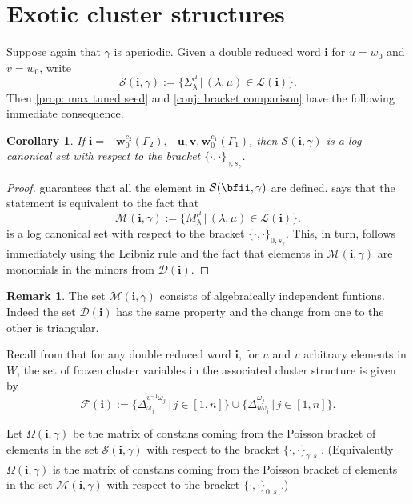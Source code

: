 \documentclass[a4paper]{amsart}
\newtheorem{corollary}[theorem]{Corollary}
\theoremstyle{definition}
\newtheorem{remark}[theorem]{Remark}
\newcommand{\mcF}{\mathcal{F}}
\newcommand{\mcL}{\mathcal{L}}
\newcommand{\mcD}{\mathcal{D}}
\newcommand{\mcM}{\mathcal{M}}
\newcommand{\mcS}{\mathcal{S}}
\newcommand{\bfi}{\mathbf{i}}
\newcommand{\bfu}{\mathbf{u}}
\newcommand{\bfv}{\mathbf{v}}
\newcommand{\bfw}{\mathbf{w}}
\begin{document}
\section{Exotic cluster structures}
Suppose again that $\gamma$ is aperiodic.
Given a double reduced word $\bfi$ for $u = w_0$ and $v = w_0$, write
\[
  \mcS(\bfi,\gamma)
  :=
  \Big\{
    \Sigma_\lambda^\mu \,\Big|\, (\lambda,\mu) \in \mcL(\bfi)
  \Big\}.
\]
Then \cref{prop: max tuned seed} and \cref{conj: bracket comparison} have the following immediate consequence.
\begin{corollary}
  If $\bfi = -\bfw^{c_2}_0(\Gamma_2), -\bfu, \bfv, \bfw^{c_1}_0(\Gamma_1)$, then $\mcS(\bfi,\gamma)$ is a log-canonical set with respect to the bracket $\{\cdot,\cdot\}_{\gamma,s_\gamma}$.
\end{corollary}
\begin{proof}
   guarantees that all the element in $\mcS(\bfii,\gamma)$ are defined.
   says that the statement is equivalent to the fact that 
  \[
    \mcM(\bfi,\gamma)
    :=
    \Big\{
      M_\lambda^\mu \,\Big|\, (\lambda,\mu) \in \mcL(\bfi)
    \Big\}.
  \]
  is a log canonical set with respect to the bracket $\{\cdot,\cdot\}_{0,s_\gamma}$.
  This, in turn, follows immediately using the Leibniz rule and the fact that elements in $\mcM(\bfi,\gamma)$ are monomials in the minors from $\mcD(\bfi)$.
\end{proof}

\begin{remark}
  The set $\mcM(\bfi,\gamma)$ consists of algebraically independent funtions. 
  Indeed the set $\mcD(\bfi)$ has the same property and the change from one to the other is triangular.
\end{remark}

Recall from \cite{BFZ05} that for any double reduced word $\bfi$, for $u$ and $v$ arbitrary elements in $W$, the set of frozen cluster variables in the associated cluster structure is given by
\[
  \mcF(\bfi)
  :=
  \Big\{\Delta_{\omega_j}^{v^{-1}\omega_j} \,\Big|\, j \in [1,n] \Big\}
  \cup
  \Big\{\Delta_{u\omega_j}^{\omega_j} \,\Big|\, j \in [1,n] \Big\}.
\]



Let $\Omega(\bfi,\gamma)$ be the matrix of constans coming from the Poisson bracket of elements in the set $\mcS(\bfi,\gamma)$ with respect to the bracket $\{\cdot,\cdot\}_{\gamma,s_\gamma}$.
(Equivalently $\Omega(\bfi,\gamma)$ is the matrix of constans coming from the Poisson bracket of elements in the set $\mcM(\bfi,\gamma)$ with respect to the bracket $\{\cdot,\cdot\}_{0,s_\gamma}$.)
\end{document}
